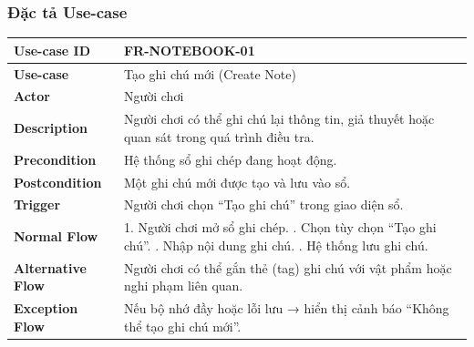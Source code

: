 \subsubsection{Đặc tả Use-case}

\begin{table}[H]
\centering
\begin{tabular}{|p{4cm}|p{10cm}|}
\hline
\textbf{Use-case ID} & FR-NOTEBOOK-01 \\ \hline
\textbf{Use-case} & Tạo ghi chú mới (Create Note) \\ \hline
\textbf{Actor} & Người chơi \\ \hline
\textbf{Description} & Người chơi có thể ghi chú lại thông tin, giả thuyết hoặc quan sát trong quá trình điều tra. \\ \hline
\textbf{Precondition} & Hệ thống sổ ghi chép đang hoạt động. \\ \hline
\textbf{Postcondition} & Một ghi chú mới được tạo và lưu vào sổ. \\ \hline
\textbf{Trigger} & Người chơi chọn “Tạo ghi chú” trong giao diện sổ. \\ \hline
\textbf{Normal Flow} &
1. Người chơi mở sổ ghi chép. \newline
2. Chọn tùy chọn “Tạo ghi chú”. \newline
3. Nhập nội dung ghi chú. \newline
4. Hệ thống lưu ghi chú. \\ \hline
\textbf{Alternative Flow} &
Người chơi có thể gắn thẻ (tag) ghi chú với vật phẩm hoặc nghi phạm liên quan. \\ \hline
\textbf{Exception Flow} &
Nếu bộ nhớ đầy hoặc lỗi lưu → hiển thị cảnh báo “Không thể tạo ghi chú mới”. \\ \hline
\end{tabular}
\end{table}


